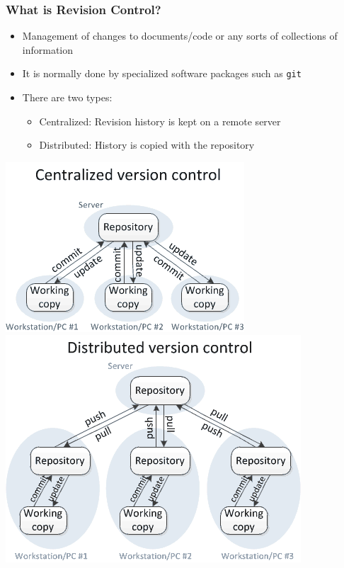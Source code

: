 \begin{frame}
  \frametitle{What is Revision Control?}

  \begin{itemize}
    \item Management of changes to documents/code or any sorts of collections
      of information
    \item It is normally done by specialized software packages such as
      \texttt{git}
    \item There are two types:
      \begin{itemize}
        \item Centralized: Revision history is kept on a remote server
        \item Distributed: History is copied with the repository
      \end{itemize}
  \end{itemize}

  \begin{center}
    \includegraphics[width=0.45\linewidth]{figures/git-centralized}
    \includegraphics[width=0.45\linewidth]{figures/git-distributed}
  \end{center}

\end{frame}


